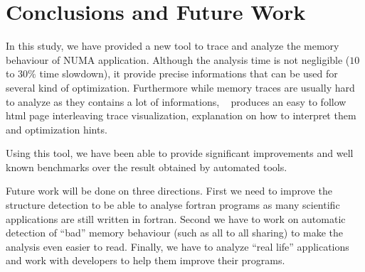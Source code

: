 
\section{Conclusions and Future Work}
\label{sec:concl}


In this study, we have provided a new tool to trace and analyze the memory
behaviour of NUMA application. Although the analysis time is not negligible
($10$ to $30\%$ time slowdown), it provide precise informations that can be
used for several kind of optimization. Furthermore while memory traces are
usually hard to analyze as they contains a lot of informations, \TABARNAC~
produces an easy to follow html page interleaving trace visualization,
explanation on how to interpret them and optimization hints.

Using this tool, we have been able to provide significant improvements and
well known benchmarks over the result obtained by automated tools.

Future work will be done on three directions. First we need to improve the
structure detection to be able to analyse fortran programs as many
scientific applications are still written in fortran. Second we have to work
on automatic detection of ``bad'' memory behaviour (such as all to all sharing)
to make the analysis even easier to read. Finally, we have to analyze ``real
life'' applications and work with developers to help them improve their
programs.
